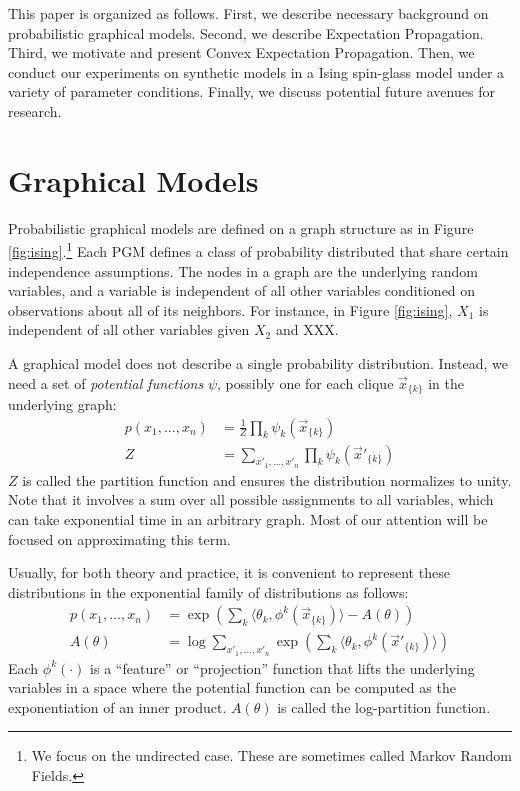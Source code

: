 \documentclass[times, 10pt,twocolumn]{article}
\newcommand{\clique}[1]{\vec #1_{\{k\}}}
\begin{document}
This paper is organized as follows. First, we describe necessary
background on probabilistic graphical models. Second, we describe
Expectation Propagation. Third, we motivate and present Convex
Expectation Propagation. Then, we conduct our experiments on
synthetic models in a Ising spin-glass model under a variety of
parameter conditions. Finally, we discuss potential future avenues
for research.

\section{Graphical Models}

Probabilistic graphical models are defined on a graph structure as
in Figure \ref{fig:ising}.\footnote{We focus on the undirected case.
These are sometimes called Markov Random Fields.} Each PGM defines
a class of probability distributed that share certain independence
assumptions.  The nodes in a graph are the underlying random variables,
and a variable is independent of all other variables conditioned on
observations about all of its neighbors. For instance, in Figure
\ref{fig:ising}, $X_1$ is independent of all other variables given
$X_2$ and XXX.

A graphical model does not describe a single probability distribution.
Instead, we need a set of \textit{potential functions} $\psi$, possibly
one for each clique $\clique{x}$ in the underlying graph:
\begin{equation}
  \begin{split}
    p(x_1, \ldots, x_n) &= \frac1Z \prod_{k} \psi_k(\clique{x}) \\
    Z &= \sum_{x'_1, \ldots, x'_n} \prod_{k} \psi_k(\clique{x'})
   \end{split}
   \label{eqn:prob}
 \end{equation}
$Z$ is called the partition function and ensures the distribution
normalizes to unity. Note that it involves a sum over all possible
assignments to all variables, which can take exponential time in an
arbitrary graph. Most of our attention will be focused on
approximating this term.

Usually, for both theory and practice, it is convenient to
represent these distributions in the exponential family of
distributions as follows:
\begin{equation}
  \begin{split}
    p(x_1, \ldots, x_n) &= \exp\left ( \sum_{k} \langle \theta_k,
    \phi^k(\clique{x}) \rangle - A(\theta) \right ) \\
    A(\theta) &= \log \sum_{x'_1, \ldots, x'_n}  \exp\left (
    \sum_{k} \langle \theta_k, \phi^k(\clique{x'}) \rangle \right )
   \end{split}
 \end{equation}
Each $\phi^k(\cdot)$ is a ``feature'' or ``projection'' function
that lifts the underlying variables in a space where the potential
function can be computed as the exponentiation of an inner product.
$A(\theta)$ is called the log-partition function.
\end{document}
